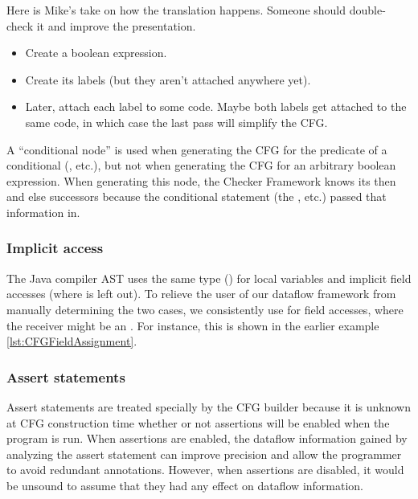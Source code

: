

\begin{workinprogress}
Here is Mike's take on how the translation happens.  Someone should
double-check it and improve the presentation.
\begin{itemize}
\item
Create a boolean expression.
\item
Create its labels (but they aren't attached anywhere yet).
\item
Later, attach each label to some code.
Maybe both labels get attached to the same code, in which case the last
pass will simplify the CFG.
\end{itemize}

A ``conditional node'' is used when generating the CFG for the predicate of
a conditional (, etc.), but not when generating the CFG for an
arbitrary boolean expression.  When generating this node, the Checker
Framework knows its then and else successors because the conditional
statement (the , etc.) passed that information in.

\end{workinprogress}


\subsubsection{Implicit  access}

The Java compiler AST uses the same type () for local variables
and implicit field accesses (where  is left out).
To relieve the user of our dataflow framework from manually determining
the two cases, we consistently use  for field accesses,
where the receiver might be an .
For instance, this is shown in the earlier example \autoref{lst:CFGFieldAssignment}.


\subsubsection{Assert statements}
\label{sec:assert-stmts}

Assert statements are treated specially by the CFG builder because it is unknown at CFG construction time whether or not assertions will be enabled when the program is run.  When assertions are enabled, the dataflow information gained by analyzing the assert statement can improve precision and allow the programmer to avoid redundant annotations.  However, when assertions are disabled, it would be unsound to assume that they had any effect on dataflow information.

